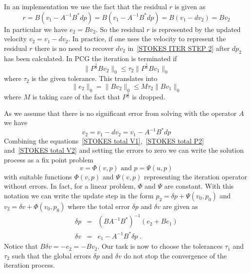 In an implementation we use the fact that the residual $r$ is given as
\begin{equation} \label{STOKES RES }
 r= B (v_{1} -  A^{-1} B^{*} dp) =  B (v_{1} - A^{-1} B^{*} dp) = B (v_{1}-dv_{2}) = B v_{2}
\end{equation}
In particular we have $e_{2} = B v_{2}$.
So the residual $r$ is represented by the updated velocity $v_{2}=v_{1}-dv_{2}$.
In practice, if one uses the velocity to represent the residual $r$ there is
no need to recover $dv_{2}$ in~\ref{STOKES ITER STEP 2} after $dp_{2}$ has
been calculated.
In PCG the iteration is terminated if
\begin{equation} \label{STOKES P OPERATOR ERROR}
\| P^{\frac{1}{2}}B v_{2} \|_{0} \le \tau_{2} \| P^{\frac{1}{2}}B v_{1} \|_{0}
\end{equation}
where $\tau_{2}$ is the given tolerance. This translates into
\begin{equation} \label{STOKES P OPERATOR ERROR 2}
\|e_{2}\|_{0} = \| B v_{2} \|_{0} \le M \tau_{2} \| B v_{1} \|_{0}
\end{equation}
where $M$ is taking care of the fact that $P^{\frac{1}{2}}$ is dropped.

As we assume that there is no significant error from solving with the operator
$A$ we have 
\begin{equation} \label{STOKES total V2}
v_{2} =  v_{1} - dv_{2} 
= v_{1}  - A^{-1} B^{*}dp 
\end{equation}
Combining the equations~\ref{STOKES total V1},~\ref{STOKES total P2} and~\ref{STOKES total V2}
and setting the errors to zero we can write the solution process as a fix
point problem
\begin{equation} 
v = \Phi(v,p) \mbox{ and } p = \Psi(u,p) 
\end{equation}
with suitable functions $\Phi(v,p)$ and $ \Psi(v,p)$ representing the
iteration operator without errors. In fact, for a linear problem, $\Phi$ and
$\Psi$ are constant. With this notation we can write the update step in the
form $p_{2}= \delta p + \Psi(v_{0},p_{0})$ and $v_{2}= \delta v + \Phi(v_{0},p_{0})$
where the total error $\delta p$ and $\delta v$ are given as
\begin{equation} 
 \begin{array}{rcl}
\delta p & = &  (B A^{-1} B^{*})^{-1} ( e_{2} + B e_{1} ) \\
\delta v & = &  e_{1} -  A^{-1} B^{*}\delta p  \;.
\end{array}\label{STOKES ERRORS}
\end{equation}
Notice that $B\delta v = - e_{2}=-Bv_{2}$.
Our task is now to choose the tolerances $\tau_{1}$ and $\tau_{2}$ such that
the global errors $\delta p$ and $\delta v$ do not stop the convergence of the
iteration process.

